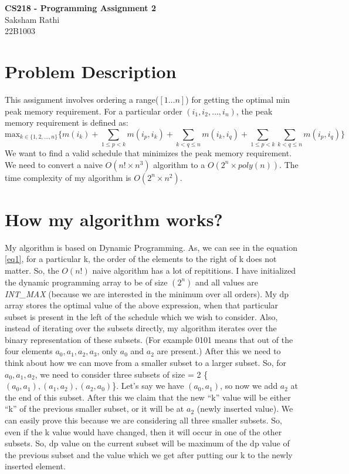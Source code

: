 \documentclass[a4paper,12pt]{article}
\begin{document}
\vspace{5cm}
\begin{center}
    \textbf{\Huge CS218 - Programming Assignment 2}\\
    \vspace{1cm}
    Saksham Rathi\\
    22B1003
\end{center}
\vspace{2cm}

\section{Problem Description}
This assignment involves ordering a range($[1 \dots n]$) for getting the optimal min peak memory requirement.
For a particular order $(i_1, i_2, \dots, i_n)$, the peak memory requirement is defined as:
\begin{equation}
    \label{eq1}
    \text{max}_{k \in \{1, 2, \dots, n\}} \{m(i_k) + \sum_{1 \le p < k}m(i_p, i_k) + \sum_{k < q \le n}m(i_k, i_q) + \sum_{1 \le p < k}\sum_{k < q \le n} m(i_p, i_q)\}
\end{equation}
We want to find a valid schedule that minimizes the peak memory requirement.
We need to convert a naive $O(n! \times n^3)$ algorithm to a $O(2^n \times poly(n))$. The time complexity of my algorithm is $O(2^n \times n^2)$.


\section{How my algorithm works?}
My algorithm is based on Dynamic Programming. As, we can see in the equation \ref{eq1}, for a particular k, the order of the elements to the right of k does not matter.
So, the $O(n!)$ naive algorithm has a lot of repititions. I have initialized the dynamic programming array to be of size $(2^n)$ and all values are \emph{INT\_MAX} (because we are interested in the minimum over all orders). My dp array stores the optimal value of the above expression, when that particular subset is present in the left of the schedule which we wish to consider.
Also, instead of iterating over the subsets directly, my algorithm iterates over the binary representation of these subsets. (For example 0101 means that out of the four elements $a_0, a_1, a_2, a_3$, only $a_0$ and $a_2$ are present.)
After this we need to think about how we can move from a smaller subset to a larger subset. So, for $a_0, a_1, a_2$, we need to consider three subsets of size = 2 \{$(a_0, a_1), (a_1, a_2), (a_2, a_0)$\}. Let's say we have $(a_0, a_1)$, so now we add $a_2$ at the end of this subset.
After this we claim that the new ``k'' value will be either ``k'' of the previous smaller subset, or it will be at $a_2$ (newly inserted value). We can easily prove this because we are considering all three smaller subsets. So, even if the k value would have changed, then it will occur in one of the other subsets.
So, dp value on the current subset will be maximum of the dp value of the previous subset and the value which we get after putting our k to the newly inserted element.
\end{document}
